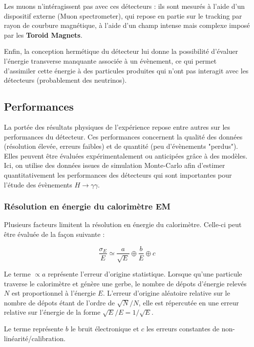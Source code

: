 \documentclass[11pt]{article} %
\begin{document}
Les muons n'intéragissent pas avec ces détecteurs : ils sont mesurés à l'aide d'un dispositif externe (Muon spectrometer), qui repose en partie sur le tracking par rayon de courbure magnétique, à l'aide d'un champ intense mais complexe imposé par les \textbf{Toroid Magnets}.

Enfin, la conception hermétique du détecteur lui donne la possibilité d'évaluer l'énergie transverse manquante associée à un évènement, ce qui permet d'assimiler cette énergie à des particules produites qui n'ont pas interagit avec les détecteurs (probablement des neutrinos).

\subsection{Performances}

La portée des résultats physiques de l'expérience repose entre autres sur les performances du détecteur. Ces performances concernent la qualité des données (résolution élevée, erreurs faibles) et de quantité (peu d'évènements "perdus"). Elles peuvent être évaluées expérimentalement ou anticipées grâce à des modèles. Ici, on utilise des données issues de simulation Monte-Carlo afin d'estimer quantitativement les performances des détecteurs qui sont importantes pour l'étude des évènements $H \to \gamma \gamma$.

\subsubsection{Résolution en énergie du calorimètre EM}

Plusieurs facteurs limitent la résolution en énergie du calorimètre. Celle-ci peut être évaluée de la façon suivante :

\begin{equation}
\dfrac{\sigma_E}{E} \simeq \dfrac{a}{\sqrt{E}} \oplus \dfrac{b}{E} \oplus c
\end{equation}

Le terme $\propto a$ représente l'erreur d'origine statistique. Lorsque qu'une particule traverse le calorimètre et génère une gerbe, le nombre de dépots d'énergie relevés $N$ est proportionnel à l'énergie $E$. L'erreur d'origine aléatoire relative sur le nombre de dépots étant de l'ordre de $\sqrt{N}/N$, elle est répercutée en une erreur relative sur l'énergie de la forme $\sqrt{E}/E = 1/\sqrt{E}$.

Le terme représente $b$ le bruit électronique et $c$ les erreurs constantes de non-linéarité/calibration.
\end{document}

